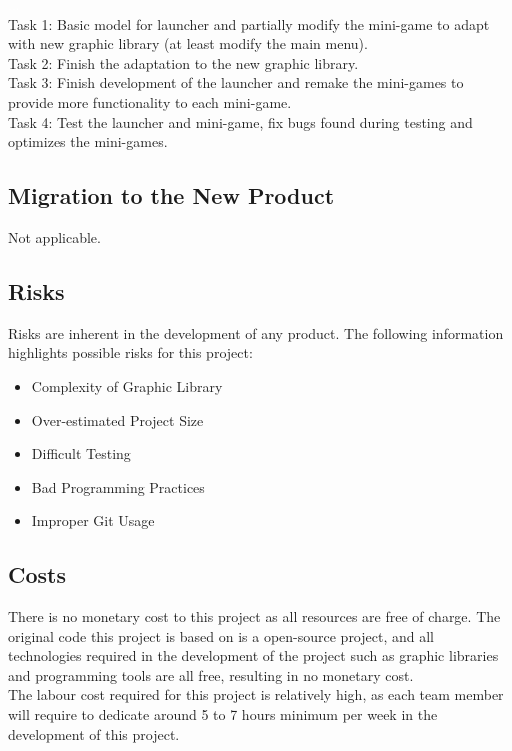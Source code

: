 \documentclass[12pt, titlepage]{article}
\begin{document}
\textcolor{white}{...}\\ %
Task 1: Basic model for launcher and partially modify the mini-game to adapt with new graphic library (at least modify the main menu).\\
Task 2: Finish the adaptation to the new graphic library.\\
Task 3: Finish development of the launcher and remake the mini-games to provide more functionality to each mini-game.\\
Task 4: Test the launcher and mini-game, fix bugs found during testing and optimizes the mini-games.

\subsection{Migration to the New Product}

Not applicable.

\subsection{Risks}

Risks are inherent in the development of any product. The following information highlights possible risks for this project:
\begin{itemize}
    \item Complexity of Graphic Library
    \item Over-estimated Project Size
    \item Difficult Testing
    \item Bad Programming Practices
    \item Improper Git Usage
\end{itemize}

\subsection{Costs}

There is no monetary cost to this project as all resources are free of charge. The original code this project is based on is a open-source project, and all technologies required in the development of the project such as graphic libraries and programming tools are all free, resulting in no monetary cost.\\
The labour cost required for this project is relatively high, as each team member will require to dedicate around 5 to 7 hours minimum per week in the development of this project.
\end{document}

